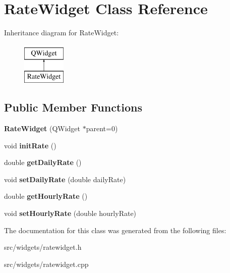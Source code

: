 \hypertarget{classRateWidget}{\section{Rate\+Widget Class Reference}
\label{classRateWidget}
}
Inheritance diagram for Rate\+Widget\+:\begin{figure}[H]
\begin{center}
\leavevmode
\includegraphics[height=2.000000cm]{dc/da5/classRateWidget}
\end{center}
\end{figure}
\subsection*{Public Member Functions}
\begin{DoxyCompactItemize}
\item 
\hypertarget{classRateWidget_ad1cb6a97e47b408043e83708ff8af15e}{{\bfseries Rate\+Widget} (Q\+Widget $\ast$parent=0)}\label{classRateWidget_ad1cb6a97e47b408043e83708ff8af15e}

\item 
\hypertarget{classRateWidget_a4a3ec9a546055d6ecb3bd1a9ee8082a6}{void {\bfseries init\+Rate} ()}\label{classRateWidget_a4a3ec9a546055d6ecb3bd1a9ee8082a6}

\item 
\hypertarget{classRateWidget_a0a72cea5ff524b47e513dcb21aea2022}{double {\bfseries get\+Daily\+Rate} ()}\label{classRateWidget_a0a72cea5ff524b47e513dcb21aea2022}

\item 
\hypertarget{classRateWidget_a8a3bccabb5c33e9f617ed85a68398b5a}{void {\bfseries set\+Daily\+Rate} (double daily\+Rate)}\label{classRateWidget_a8a3bccabb5c33e9f617ed85a68398b5a}

\item 
\hypertarget{classRateWidget_a50285d4472979e004c706ff5640e8227}{double {\bfseries get\+Hourly\+Rate} ()}\label{classRateWidget_a50285d4472979e004c706ff5640e8227}

\item 
\hypertarget{classRateWidget_a8135738c8a54389110de6751d9e2728e}{void {\bfseries set\+Hourly\+Rate} (double hourly\+Rate)}\label{classRateWidget_a8135738c8a54389110de6751d9e2728e}

\end{DoxyCompactItemize}


The documentation for this class was generated from the following files\+:\begin{DoxyCompactItemize}
\item 
src/widgets/ratewidget.\+h\item 
src/widgets/ratewidget.\+cpp\end{DoxyCompactItemize}
